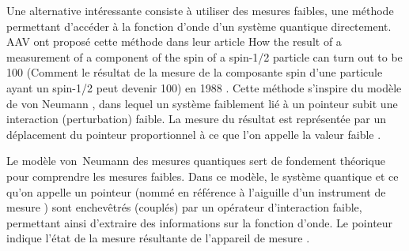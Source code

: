 \begin{onehalfspace}
    
    Une alternative intéressante consiste à utiliser des mesures faibles, 
    une méthode permettant d’accéder à la fonction d’onde d’un système 
    quantique directement. AAV ont proposé cette méthode dans leur 
    article \guillemetleft \space How the result of a measurement of a component 
    of the spin of a spin-1/2 particle can turn out to be 100 
    \guillemetright \space (Comment le résultat de la mesure de la composante 
    spin d’une particule ayant un spin-1/2 peut devenir 100) en 1988 
    \cite{Aharonov}. Cette méthode s’inspire du modèle de von Neumann 
    \cite{vonNeumann}, dans lequel un système faiblement lié à un 
    \guillemetleft \space pointeur \guillemetright \space subit une interaction 
    (perturbation) faible. La mesure du résultat est représentée par un 
    déplacement du pointeur proportionnel à ce que l’on appelle la 
    \guillemetleft \space valeur faible \guillemetright. 

    \noindent Le modèle von Neumann des mesures quantiques sert de 
    fondement théorique pour comprendre les mesures faibles. Dans ce 
    modèle, le système quantique et ce qu’on appelle un \guillemetleft \space 
    pointeur \guillemetright \space (nommé en référence à l’aiguille d’un 
    instrument de mesure \cite{vonNeumann}) sont enchevêtrés (couplés) par un 
    opérateur d’interaction faible, permettant ainsi d’extraire des 
    informations sur la fonction d’onde. Le pointeur indique l'état de la 
    mesure résultante de l'appareil de mesure \cite{vonNeumann}. 


\end{onehalfspace}
